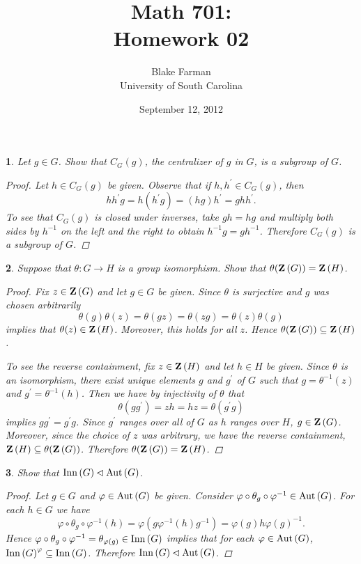\documentclass[10pt]{amsart}
\author{Blake Farman\\University of South Carolina}
\title{Math 701:\\Homework 02}
\date{September 12, 2012}
\begin{document}
\maketitle

\newtheorem{thm}{}
\newtheorem{lem}{Lemma}

\begin{thm}
  Let $g \in G$.  Show that $C_G(g)$, the centralizer of $g$ in $G$, is a subgroup of $G$.
  \begin{proof}
    Let $h \in C_G(g)$ be given.
    Observe that if $h,h^{\prime} \in C_G(g)$, then $$hh^{\prime}g = h(h^{\prime}g) = (hg)h^{\prime} = ghh^{\prime}.$$
    To see that $C_G(g)$ is closed under inverses, take $gh = hg$ and multiply both sides by $h^{-1}$ on the left and the right to obtain $h^{-1}g = gh^{-1}$.
    Therefore $C_G(g)$ is a subgroup of $G$.
  \end{proof}
\end{thm}

\begin{thm}
  Suppose that $\theta:G \rightarrow H$ is a group isomorphism.  Show that $\theta(\mathbf{Z}\left(G\right)) = \mathbf{Z}\left(H\right)$.
  \begin{proof}
    Fix $z \in \mathbf{Z}\left(G\right)$ and let $g \in G$ be given.
    Since $\theta$ is surjective and $g$ was chosen arbitrarily $$\theta(g)\theta(z) = \theta(gz) = \theta(zg) = \theta(z)\theta(g)$$
    implies that $\theta(z) \in \mathbf{Z}\left(H\right)$.
    Moreover, this holds for all $z$.
    Hence $\theta(\mathbf{Z}\left(G\right)) \subseteq \mathbf{Z}\left(H\right)$.
    
    To see the reverse containment, fix $z \in \mathbf{Z}\left(H\right)$ and let $h \in H$ be given.  
    Since $\theta$ is an isomorphism, there exist unique elements $g$ and $g^{\prime}$ of $G$ such that $g = \theta^{-1}(z)$ and $g^{\prime} = \theta^{-1}(h)$.
    Then we have by injectivity of $\theta$ that
    $$\theta(gg^{\prime}) = zh = hz = \theta(g^{\prime}g)$$
    implies $gg^{\prime} = g^{\prime}g$.
    Since $g^{\prime}$ ranges over all of $G$ as $h$ ranges over $H$, $g \in \mathbf{Z}\left(G\right)$.
    Moreover, since the choice of $z$ was arbitrary, we have the reverse containment, $\mathbf{Z}\left(H\right) \subseteq \theta(\mathbf{Z}\left(G\right))$.
    Therefore $\theta(\mathbf{Z}\left(G\right)) = \mathbf{Z}\left(H\right)$.
  \end{proof}
\end{thm}

\begin{thm}
  Show that $\operatorname{Inn}\left(G\right) \lhd \operatorname{Aut}\left(G\right)$.
  \begin{proof}
	\newcommand{\p}{\varphi \circ \theta_g \circ \varphi^{-1}}
	Let $g \in G$ and $\varphi \in \operatorname{Aut}\left(G\right)$ be given.
	Consider $\p \in \Aut{G}$.
	For each $h \in G$ we have $$\p (h) = \varphi(g\varphi^{-1}(h)g^{-1}) = \varphi(g)h\varphi(g)^{-1}.$$
	Hence $\p = \theta_{\varphi(g)} \in \Inn{G}$ implies that for each $\varphi \in \operatorname{Aut}\left(G\right)$, $\operatorname{Inn}\left(G\right)^{\varphi} \subseteq \operatorname{Inn}\left(G\right)$.
	Therefore $\operatorname{Inn}\left(G\right) \lhd \operatorname{Aut}\left(G\right)$.
  \end{proof}
\end{thm}
\end{document}
